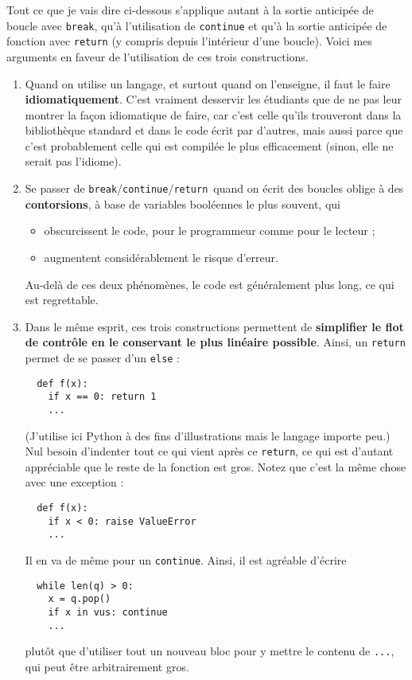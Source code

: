 \documentclass[a4paper,12pt]{article}
\newcommand{\bcr}{\texttt{break}/\texttt{continue}/\texttt{return}}
\begin{document}
Tout ce que je vais dire ci-dessous s'applique autant à la sortie
anticipée de boucle avec \texttt{break}, qu'à l'utilisation de
\texttt{continue} et qu'à la sortie anticipée de fonction avec
\texttt{return} (y compris depuis l'intérieur d'une boucle).  Voici
mes arguments en faveur de l'utilisation de ces trois constructions.
\begin{enumerate}
\item Quand on utilise un langage, et surtout quand on l'enseigne, il
  faut le faire \textbf{idiomatiquement}. C'est vraiment desservir les étudiants
  que de ne pas leur montrer la façon idiomatique de faire, car c'est
  celle qu'ils trouveront dans la bibliothèque standard et dans le
  code écrit par d'autres, mais aussi parce que c'est probablement
  celle qui est compilée le plus efficacement (sinon, elle ne serait
  pas l'idiome).

\item Se passer de \bcr\ quand on écrit des boucles oblige à
  des \textbf{contorsions}, à base de variables booléennes le plus souvent, qui
  \begin{itemize}
  \item obscurcissent le code, pour le programmeur comme pour le
    lecteur ;
  \item augmentent considérablement le risque d'erreur.
  \end{itemize}
  Au-delà de ces deux phénomènes, le code est généralement plus long, ce
  qui est regrettable.

\item Dans le même esprit, ces trois constructions permettent de
  \textbf{simplifier le flot de contrôle en le conservant le plus linéaire
  possible}. Ainsi, un \texttt{return} permet de se passer d'un
  \texttt{else} :
\begin{verbatim}
  def f(x):
    if x == 0: return 1
    ...
\end{verbatim}
  (J'utilise ici Python à des fins d'illustrations mais
  le langage importe peu.)
  Nul besoin d'indenter tout ce qui vient après ce \texttt{return}, ce qui est
  d'autant appréciable que le reste de la fonction est gros. Notez que
  c'est la même chose avec une exception :
\begin{verbatim}
  def f(x):
    if x < 0: raise ValueError
    ...
\end{verbatim}
  Il en va de même pour un \texttt{continue}. Ainsi, il est agréable d'écrire
\begin{verbatim}
  while len(q) > 0:
    x = q.pop()
    if x in vus: continue
    ...
\end{verbatim}
  plutôt que d'utiliser tout un nouveau bloc pour y mettre le contenu de
  \texttt{...}, qui peut être arbitrairement gros.


\end{enumerate}
\end{document}
